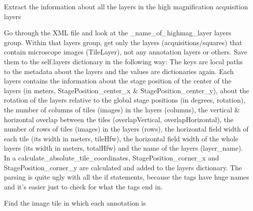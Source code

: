 \documentclass[letterpaper,10pt,english]{sphinxmanual}
\begin{document}
\begin{fulllineitems}

\begin{fulllineitems}
\label{\detokenize{index:sites_of_interest_parser.MapsXmlParser.extract_layer_metadata}}
Extract the information about all the layers in the high magnification acquisition layers

Go through the XML file and look at the \_name\_of\_highmag\_layer layers group. Within that layers group, get only
the layers (acquisitions/squares) that contain microscope images (TileLayer), not any annotation layers or
others. Save them to the self.layers dictionary in the following way: The keys are local paths to
the metadata about the layers and the values are dictionaries again. Each layers contains the information
about the stage position of the center of the layers (in meters, StagePosition\_center\_x \&
StagePosition\_center\_y), about the rotation of the layers relative to the global stage positions (in degrees,
rotation), the number of columns of tiles (images) in the layers (columns), the vertical \& horizontal overlap
between the tiles (overlapVertical, overlapHorizontal), the number of rows of tiles (images) in the layers
(rows), the horizontal field width of each tile (its width in meters, tileHfw), the horizontal field width of
the whole layers (its width in meters, totalHfw) and the name of the layers (layer\_name).
In a calculate\_absolute\_tile\_coordinates, StagePosition\_corner\_x and StagePosition\_corner\_y are calculated and
added to the layers dictionary.
The parsing is quite ugly with all the if statements, because the tags have huge names and it’s easier just
to check for what the tags end in.

\end{fulllineitems}


\begin{fulllineitems}
\label{\detokenize{index:sites_of_interest_parser.MapsXmlParser.find_annotation_tile}}
Find the image tile in which each annotation is


\end{fulllineitems}
\end{fulllineitems}
\end{document}
